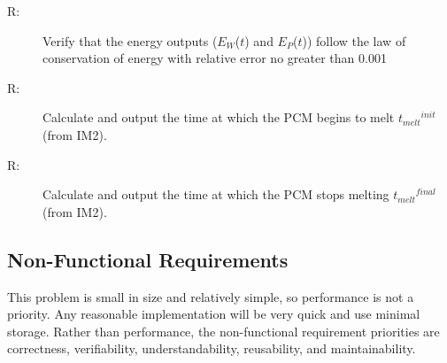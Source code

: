 \documentclass[12pt]{article}
\newcounter{reqnum}
\newcommand{\rthereqnum}{R\thereqnum}
\begin{document}
\begin{description}
\item[\rthereqnum\label{FR:req9}:]Verify that the energy outputs (${E_{W}}$($t$) and ${E_{P}}$($t$)) follow the law of conservation of energy with relative error no greater than 0.001%
\end{description}
\begin{description}
\item[\rthereqnum\label{FR:req10}:]Calculate and output the time at which the PCM begins to melt ${{t_{melt}}^{init}}$ (from IM2).
\end{description}
\begin{description}
\item[\rthereqnum\label{FR:req11}:]Calculate and output the time at which the PCM stops melting ${{t_{melt}}^{final}}$ (from IM2).
\end{description}
\subsection{Non-Functional Requirements}
\label{Sec:NFRs}
This problem is small in size and relatively simple, so performance is not a priority. Any reasonable implementation will be very quick and use minimal storage. Rather than performance, the non-functional requirement priorities are correctness, verifiability, understandability, reusability, and maintainability.
\end{document}
